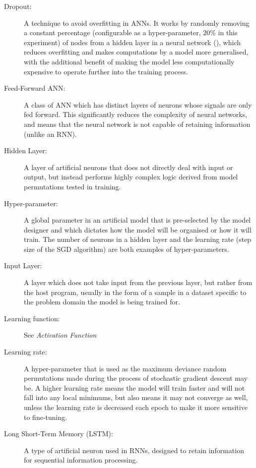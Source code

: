 \documentclass[]{report}
\begin{document}
\begin{description}
\item[Dropout:] A technique to avoid overfitting in ANNs. It works by randomly removing a constant percentage (configurable as a hyper-parameter, 20\% in this experiment) of nodes from a hidden layer in a neural network (\cite{dropout14}), which reduces overfitting and makes computations by a model more generalised, with the additional benefit of making the model less computationally expensive to operate further into the training process.

\item[Feed-Forward ANN:] A class of ANN which has distinct layers of neurons whose signals are only fed forward. This significantly reduces the complexity of neural networks, and means that the neural network is not capable of retaining information (unlike an RNN).

\item[Hidden Layer:] A layer of artificial neurons that does not directly deal with input or output, but instead performs highly complex logic derived from model permutations tested in training.

\item[Hyper-parameter:] A global parameter in an artificial model that is pre-selected by the model designer and which dictates how the model will be organised or how it will train. The number of neurons in a hidden layer and the learning rate (step size of the SGD algorithm) are both examples of hyper-parameters.

\item[Input Layer:] A layer which does not take input from the previous layer, but rather from the host program, usually in the form of a sample in a dataset specific to the problem domain the model is being trained for.

\item[Learning function:] See \textit{Activation Function}

\item[Learning rate:] A hyper-parameter that is used as the maximum deviance random permutations made during the process of stochastic gradient descent may be. A higher learning rate means the model will train faster and will not fall into any local minimums, but also means it may not converge as well, unless the learning rate is decreased each epoch to make it more sensitive to fine-tuning.

\item[Long Short-Term Memory (LSTM):] A type of artificial neuron used in RNNs, designed to retain information for sequential information processing.


\end{description}
\end{document}
